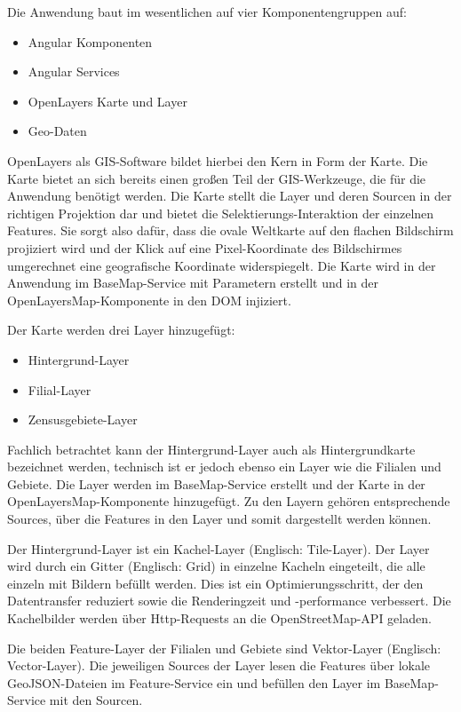 Die Anwendung baut im wesentlichen auf vier Komponentengruppen auf:

\begin{itemize}
\item Angular Komponenten
\item Angular Services
\item OpenLayers Karte und Layer
\item Geo-Daten
\end{itemize}

OpenLayers als GIS-Software bildet hierbei den Kern in Form der Karte.
Die Karte bietet an sich bereits einen großen Teil der GIS-Werkzeuge, die für die Anwendung benötigt werden.
Die Karte stellt die Layer und deren Sourcen in der richtigen Projektion dar und bietet die Selektierungs-Interaktion der einzelnen Features.
Sie sorgt also dafür, dass die ovale Weltkarte auf den flachen Bildschirm projiziert wird und der Klick auf eine Pixel-Koordinate des Bildschirmes umgerechnet eine geografische Koordinate widerspiegelt.
Die Karte wird in der Anwendung im BaseMap-Service mit Parametern erstellt und in der OpenLayersMap-Komponente in den DOM injiziert. 

Der Karte werden drei Layer hinzugefügt:

\begin{itemize}
\item Hintergrund-Layer
\item Filial-Layer
\item Zensusgebiete-Layer
\end{itemize}

Fachlich betrachtet kann der Hintergrund-Layer auch als Hintergrundkarte bezeichnet werden, technisch ist er jedoch ebenso ein Layer wie die Filialen und Gebiete. 
Die Layer werden im BaseMap-Service erstellt und der Karte in der OpenLayersMap-Komponente hinzugefügt.
Zu den Layern gehören entsprechende Sources, über die Features in den Layer und somit dargestellt werden können.

Der Hintergrund-Layer ist ein Kachel-Layer (Englisch: Tile-Layer).
Der Layer wird durch ein Gitter (Englisch: Grid) in einzelne Kacheln eingeteilt, die alle einzeln mit Bildern befüllt werden.
Dies ist ein Optimierungsschritt, der den Datentransfer reduziert sowie die Renderingzeit und -performance verbessert.
Die Kachelbilder werden über Http-Requests an die OpenStreetMap-API geladen.

Die beiden Feature-Layer der Filialen und Gebiete sind Vektor-Layer (Englisch: Vector-Layer).
Die jeweiligen Sources der Layer lesen die Features über lokale GeoJSON-Dateien im Feature-Service ein und befüllen den Layer im BaseMap-Service mit den Sourcen.


